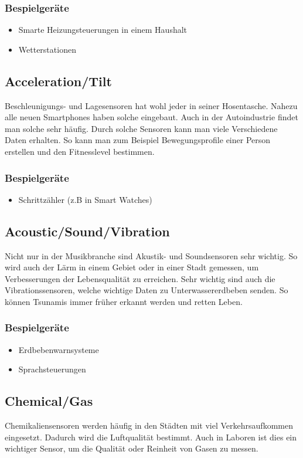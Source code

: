 \subsubsection{Bespielgeräte}
\begin{itemize}
\item	Smarte Heizungsteuerungen in einem Haushalt
\item	Wetterstationen
\end{itemize}


\subsection{Acceleration/Tilt}%
Beschleunigungs- und Lagesensoren hat wohl jeder in seiner Hosentasche. Nahezu alle neuen Smartphones haben solche eingebaut. Auch in der Autoindustrie findet man solche sehr häufig. Durch solche Sensoren kann man viele Verschiedene Daten erhalten. So kann man zum Beispiel Bewegungsprofile einer Person erstellen und den Fitnesslevel bestimmen.
\subsubsection{Bespielgeräte}
\begin{itemize}
\item	Schrittzähler (z.B in Smart Watches)
\end{itemize}


\subsection{Acoustic/Sound/Vibration}%
Nicht nur in der Musikbranche sind Akustik- und Soundsensoren sehr wichtig. So wird auch der Lärm in einem Gebiet oder in einer Stadt gemessen, um Verbesserungen der Lebensqualität zu erreichen. Sehr wichtig sind auch die Vibrationssensoren, welche wichtige Daten zu Unterwassererdbeben senden. So können Tsunamis immer früher erkannt werden und retten Leben.
\subsubsection{Bespielgeräte}
\begin{itemize}
\item	Erdbebenwarnsysteme
\item	Sprachsteuerungen
\end{itemize}


\subsection{Chemical/Gas}%
Chemikaliensensoren werden häufig in den Städten mit viel Verkehrsaufkommen eingesetzt. Dadurch wird die Luftqualität bestimmt. Auch in Laboren ist dies ein wichtiger Sensor, um die Qualität oder Reinheit von Gasen zu messen.
